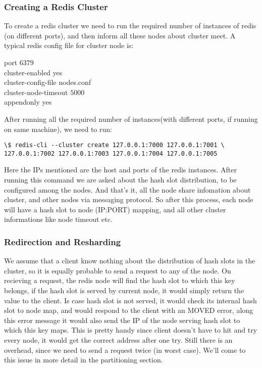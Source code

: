\documentclass[11pt]{article}
\begin{document}
\subsubsection*{Creating a Redis Cluster}
To create a redis cluster we need to run the required number of instances of redis
(on different ports), and then inform all these nodes about cluster meet. A typical
redis config file for cluster node is:
\begin{file}
port $6379$ \\
cluster-enabled yes \\
cluster-config-file nodes.conf \\
cluster-node-timeout $5000$ \\
appendonly yes \\
\end{file}

After running all the required number of instances(with different ports, if
running on same machine), we need to run:
\begin{lstlisting}
\$ redis-cli --cluster create 127.0.0.1:7000 127.0.0.1:7001 \
127.0.0.1:7002 127.0.0.1:7003 127.0.0.1:7004 127.0.0.1:7005 
\end{lstlisting}
Here the IPs mentioned are the host and ports of the redis instances. After 
running this command we are asked about the hash slot distribution, to be configured
among the nodes. And that's it, all the node share infomation about cluster,
and other nodes via messaging protocol. So after this process, each node will have a
hash slot to node (IP:PORT) mapping, and all other cluster informations like node timeout etc.

\subsubsection*{Redirection and Resharding}
We assume that a client know nothing about the distribution of hash slots in the cluster,
so it is equally probable to send a request to any of the node.
On recieving a request, the redis node will find the hash slot to which this key
belongs, if the hash slot is served by current node, it would simply return the value
to the client. Is case hash slot is not served, it would check its internal hash slot
to node map, and would respond to the client with an MOVED error, along this error
message it would also send the IP of the node serving hash slot to which this key maps.
This is pretty handy since client doesn't have to hit and try every node,
it would get the correct address after one try. Still there is an overhead, since we
need to send a request twice (in worst case). We'll come to this issue in more detail
in the partitioning section.
\\
\end{document}
